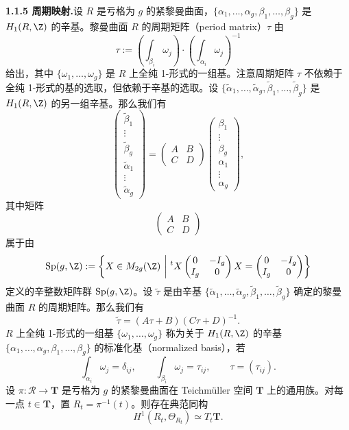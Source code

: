 \noindent\textbf{1.1.5 周期映射.}\quad 设 $R$ 是亏格为 $g$ 的紧黎曼曲面，$\{\alpha_1,\dots,\alpha_g,\beta_1,\dots,\beta_g\}$ 是 $H_1(R,\Z)$ 的辛基。黎曼曲面 $R$ 的周期矩阵（period matrix）$\tau$ 由
\begin{equation}
  \tau:=\left(\int_{\beta_i}\omega_j\right)\cdot\left(\int_{\alpha_i}\omega_j\right)^{-1} \tag{1.8}
\end{equation}
给出，其中 $\{\omega_1,\dots,\omega_g\}$ 是 $R$ 上全纯 1-形式的一组基。注意周期矩阵 $\tau$ 不依赖于全纯 1-形式的基的选取，但依赖于辛基的选取。设 $\{\tilde\alpha_1,\dots,\tilde\alpha_g,\tilde\beta_1,\dots,\tilde\beta_g\}$ 是 $H_1(R,\Z)$ 的另一组辛基。那么我们有
\[
  \begin{pmatrix}
    \tilde\beta_1\\ \vdots\\ \tilde\beta_g\\ \tilde\alpha_1\\ \vdots\\ \tilde\alpha_g
  \end{pmatrix}
  =
  \begin{pmatrix}
    A & B\\ C & D
  \end{pmatrix}
  \begin{pmatrix}
    \beta_1\\ \vdots\\ \beta_g\\ \alpha_1\\ \vdots\\ \alpha_g
  \end{pmatrix},
\]
其中矩阵
\[
  \begin{pmatrix}
    A & B\\ C & D
  \end{pmatrix}
\]
属于由
\[
  \operatorname{Sp}(g,\Z):=\left\{X\in M_{2g}(\Z)\ \middle|\ {}^tX
  \begin{pmatrix}
    0 & -I_g\\ I_g & 0
  \end{pmatrix}
  X=
  \begin{pmatrix}
    0 & -I_g\\ I_g & 0
  \end{pmatrix}
  \right\}
\]
定义的辛整数矩阵群 $\operatorname{Sp}(g,\Z)$。设 $\tilde\tau$ 是由辛基 $\{\tilde\alpha_1,\dots,\tilde\alpha_g,\tilde\beta_1,\dots,\tilde\beta_g\}$ 确定的黎曼曲面 $R$ 的周期矩阵。那么我们有
\[
  \tilde\tau=(A\tau+B)(C\tau+D)^{-1}.
\]
$R$ 上全纯 1-形式的一组基 $\{\omega_1,\dots,\omega_g\}$ 称为关于 $H_1(R,\Z)$ 的辛基 $\{\alpha_1,\dots,\alpha_g,\beta_1,\dots,\beta_g\}$ 的标准化基（normalized basis），若
\begin{equation}
  \int_{\alpha_i}\omega_j=\delta_{ij},\qquad \int_{\beta_i}\omega_j=\tau_{ij},\qquad \tau=(\tau_{ij}). \tag{1.9}
\end{equation}
设 $\pi:\mathcal{R}\to\mathbf{T}$ 是亏格为 $g$ 的紧黎曼曲面在 Teichmüller 空间 $\mathbf{T}$ 上的通用族。对每一点 $t\in\mathbf{T}$，置 $R_t=\pi^{-1}(t)$。则存在典范同构
\begin{equation}
  H^1(R_t,\Theta_{R_t})\simeq T_t\mathbf{T}. \tag{1.10}
\end{equation}

